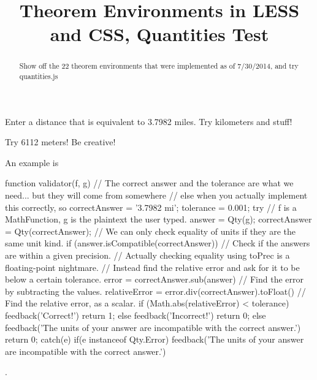 \documentclass{ximera}
\begin{document}
\begin{abstract}
Show off the 22 theorem environments that were implemented as of 7/30/2014, and try quantities.js
\end{abstract}

\title{Theorem Environments in LESS and CSS, Quantities Test}


\begin{exercise}
Enter a distance that is equivalent to 3.7982 miles. Try kilometers and stuff!

\begin{solution}
\begin{hint}
Try 6112 meters! Be creative!
\end{hint}
An example is \begin{expression-answer}
	function validator(f, g) {
		// The correct answer and the tolerance are what we need... but they will come from somewhere
		// else when you actually implement this correctly, so 
		correctAnswer = '3.7982 mi';
		tolerance = 0.001;
		try {
			// f is a MathFunction, g is the plaintext the user typed.
			answer = Qty(g);
			correctAnswer = Qty(correctAnswer);   
			// We can only check equality of units if they are the same unit kind.
			if (answer.isCompatible(correctAnswer))
			{
				// Check if the answers are within a given precision. 
				// Actually checking equality using toPrec is a floating-point nightmare.
				// Instead find the relative error and ask for it to be below a certain tolerance.
			    error = correctAnswer.sub(answer)		  			// Find the error by subtracting the values.
			    relativeError = error.div(correctAnswer).toFloat()  // Find the relative error, as a scalar.
				if (Math.abs(relativeError) < tolerance) {
					feedback('Correct!')
					return 1;
				} else {
					feedback('Incorrect!')
					return 0;
				}
			} else {
				feedback('The units of your answer are incompatible with the correct answer.')
				return 0;
			}
		}
		catch(e) {
		  if(e instanceof Qty.Error) {
		    feedback('The units of your answer are incompatible with the correct answer.')
		  }
		}
	}
\end{expression-answer}.
\end{solution}

\end{exercise}
\end{document}

